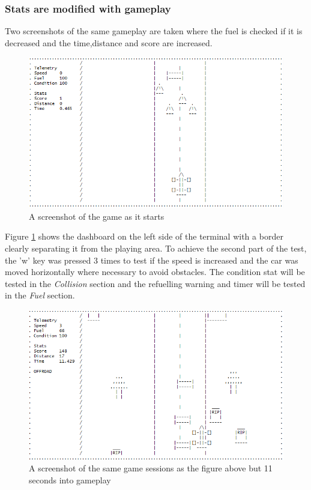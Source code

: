 \documentclass{article}
\begin{document}
\subsubsection*{Stats are modified with gameplay}
Two screenshots of the same gameplay are taken where the fuel is checked if it is decreased and the time,distance and score are increased.
\begin{figure}[!ht]
	\begin{center}
	\includegraphics[width=0.75\paperwidth]{images/dashboard_test_statschange}
	\caption{A screenshot of the game as it starts}
	\label{fig:dashboard_test_stats} 
	\end{center}
\end{figure}
\newline
Figure \ref{fig:dashboard_test_stats} shows the dashboard on the left side of the terminal with a border clearly separating it from the playing area. To achieve the second part of the test, the 'w' key was pressed 3 times to test if the speed is increased and the car was moved horizontally where necessary to avoid obstacles. 
\newline
The condition stat will be tested in the \emph{Collision} section and the refuelling warning and timer will be tested in the \emph{Fuel} section.  
\newpage
\begin{figure}[!ht]
	\begin{center}
	\includegraphics[width=0.75\paperwidth]{images/dashboard_test_statschange2}
	\caption{A screenshot of the same game sessions as the figure above but 11 seconds into gameplay}
	\label{fig:dashboard_test_stats2} 
	\end{center}
\end{figure}
\end{document}
